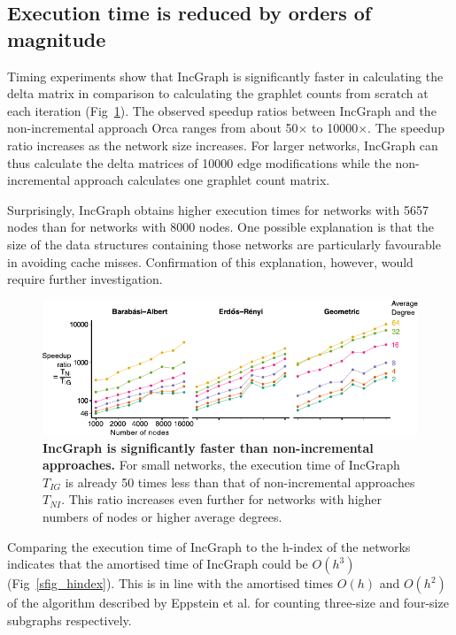 \subsection*{Execution time is reduced by orders of magnitude}
Timing experiments show that IncGraph is significantly faster in calculating the delta matrix in comparison to calculating the graphlet counts from scratch at each iteration (Fig~\ref{fig_speedup}). The observed speedup ratios between IncGraph and the non-incremental approach Orca ranges from about 50$\times$ to 10000$\times$. The speedup ratio increases as the network size increases. For larger networks, IncGraph can thus calculate the delta matrices of 10000 edge modifications while the non-incremental approach calculates one graphlet count matrix.

Surprisingly, IncGraph obtains higher execution times for networks with 5657 nodes than for networks with 8000 nodes. One possible explanation is that the size of the data structures containing those networks are particularly favourable in avoiding cache misses. Confirmation of this explanation, however, would require further investigation.

\begin{figure}[ht!]
	\centering
	\includegraphics[width=.8\textwidth]{fig/figure5.pdf}
	\caption{{\bf IncGraph is significantly faster than non-incremental approaches.}
		For small networks, the execution time of IncGraph $T_{IG}$ is already 50 times less than that of non-incremental approaches $T_{NI}$. This ratio increases even further for networks with higher numbers of nodes or higher average degrees.}
	\label{fig_speedup}
\end{figure}

Comparing the execution time of IncGraph to the h-index of the networks indicates that the amortised time of IncGraph could be $O(h^3)$ (Fig~\ref{sfig_hindex}). This is in line with the amortised times $O(h)$ and $O(h^2)$ of the algorithm described by Eppstein et al. \cite{eppstein_extendeddynamicsubgraph_2012} for counting three-size and four-size subgraphs respectively.

